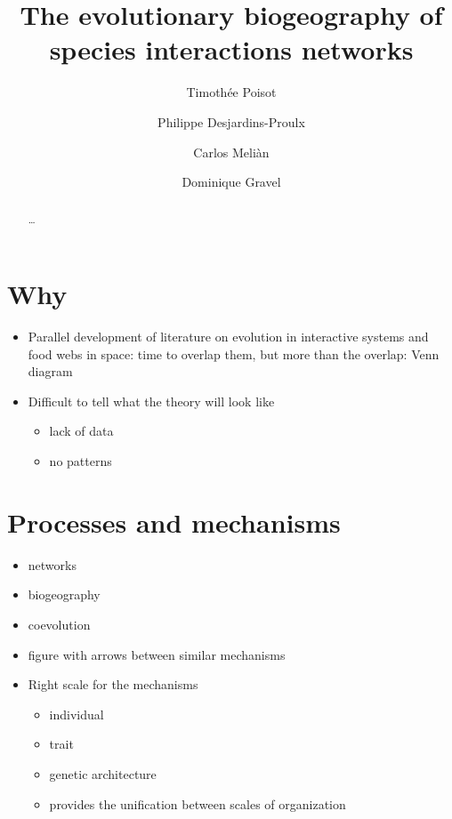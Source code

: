 \documentclass[11pt,oneside]{scrartcl}
\title{The evolutionary biogeography of species interactions networks}
\author{Timoth\'ee Poisot \and Philippe Desjardins-Proulx \and Carlos Meli\`an \and Dominique Gravel}
\begin{document}
\maketitle
\begin{abstract}
	\ldots 
\end{abstract}
\doublespacing


\section{Why}
\label{why}

\begin{itemize}

\item Parallel development of literature on evolution in interactive systems and food webs in space: time to overlap them, but more than the overlap: Venn diagram


\item Difficult to tell what the theory will look like

\begin{itemize}

\item lack of data
\item no patterns
\end{itemize}


\end{itemize}

\section{Processes and mechanisms}
\label{processesandmechanisms}

\begin{itemize}
	\item networks
	\item biogeography 
	\item coevolution
	\item figure with arrows between similar mechanisms
	\item Right scale for the mechanisms
		\begin{itemize}
			\item individual
			\item trait
			\item genetic architecture
			\item provides the unification between scales of organization
		\end{itemize}
\end{itemize}
\end{document}
